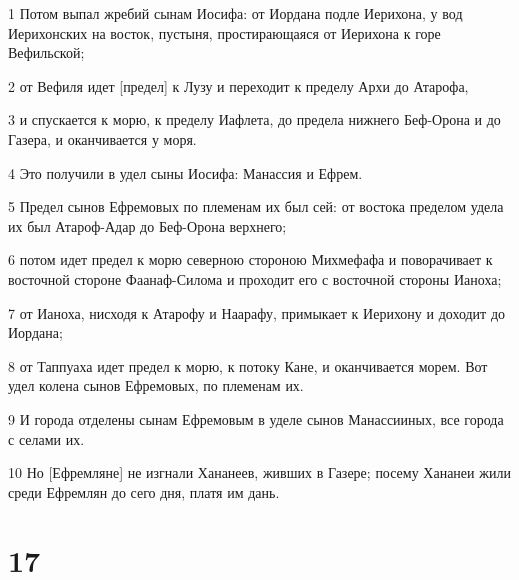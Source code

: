 \par 1 Потом выпал жребий сынам Иосифа: от Иордана подле Иерихона, у вод Иерихонских на восток, пустыня, простирающаяся от Иерихона к горе Вефильской;
\par 2 от Вефиля идет [предел] к Лузу и переходит к пределу Архи до Атарофа,
\par 3 и спускается к морю, к пределу Иафлета, до предела нижнего Беф-Орона и до Газера, и оканчивается у моря.
\par 4 Это получили в удел сыны Иосифа: Манассия и Ефрем.
\par 5 Предел сынов Ефремовых по племенам их был сей: от востока пределом удела их был Атароф-Адар до Беф-Орона верхнего;
\par 6 потом идет предел к морю северною стороною Михмефафа и поворачивает к восточной стороне Фаанаф-Силома и проходит его с восточной стороны Ианоха;
\par 7 от Ианоха, нисходя к Атарофу и Наарафу, примыкает к Иерихону и доходит до Иордана;
\par 8 от Таппуаха идет предел к морю, к потоку Кане, и оканчивается морем. Вот удел колена сынов Ефремовых, по племенам их.
\par 9 И города отделены сынам Ефремовым в уделе сынов Манассииных, все города с селами их.
\par 10 Но [Ефремляне] не изгнали Хананеев, живших в Газере; посему Хананеи жили среди Ефремлян до сего дня, платя им дань.

\chapter{17}


